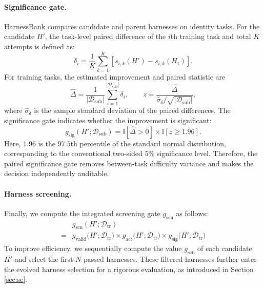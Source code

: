 \paragraph{Significance gate.}
HarnessBank compares candidate and parent harnesses on identity tasks.
%
For the candidate $H'$, the task-level paired difference of the $i$th training task and total $K$ attempts is defined as:
\begin{equation}
\delta_i
=
\frac{1}{K}
\sum_{k=1}^{K}
\left[
s_{i,k}(H')-s_{i,k}(H_{\mathrm{t}})
\right].
\end{equation}
%
For training tasks, the estimated improvement and paired statistic are
\begin{equation}
\widehat{\Delta}
=
\frac{1}{|\mathcal{D}_{\mathrm{sub}}|}\sum_{i=1}^{|\mathcal{D}_{\mathrm{sub}}|}\delta_i,
\qquad
z
=
\frac{\widehat{\Delta}}
{\widehat{\sigma}_{\delta}/\sqrt{|\mathcal{D}_{\mathrm{sub}}|}},
\end{equation}
where $\widehat{\sigma}_{\delta}$ is the sample standard deviation of the paired differences.
%
The significance gate indicates whether the improvement is significant:
\begin{equation}
g_{\mathrm{sig}}(H';\mathcal{D}_{\mathrm{sub}})
=
\mathbb{I}
\left[\widehat{\Delta}>0
\right]
\times
\mathbb{I}
\left[z\geq1.96
\right]
.
\end{equation}
%
Here, $1.96$ is the $97.5$th percentile of the standard normal distribution, corresponding to the conventional two-sided $5\%$ significance level.
%
Therefore, the paired significance gate removes between-task difficulty variance and makes the decision independently auditable.
%

\paragraph{Harness screening.}
Finally, we compute the integrated screening gate $g_{\mathrm{scn}}$ as follows:
\begin{equation}
\begin{aligned}
&g_{\mathrm{scn}}(H';\mathcal{D}_{\mathrm{tr}})\\
=
&g_{\mathrm{valid}}
\bigl(H';\mathcal{D}_{\mathrm{tr}}\bigr)
\times
g_{\mathrm{act}}
\bigl(H';\mathcal{D}_{\mathrm{tr}}\bigr)
\times
g_{\mathrm{sig}}\bigl(H';\mathcal{D}_{\mathrm{tr}}\bigr)
\label{eq:navigation}
\end{aligned}
\end{equation}
%
To improve efficiency, we sequentially compute the value $g_{\mathrm{scn}}$ of each candidate $H'$ and select the first-$N$ passed harnesses.
%
These filtered harnesses further enter the evolved harness selection for a rigorous evaluation, as introduced in Section \ref{sec:se}.

